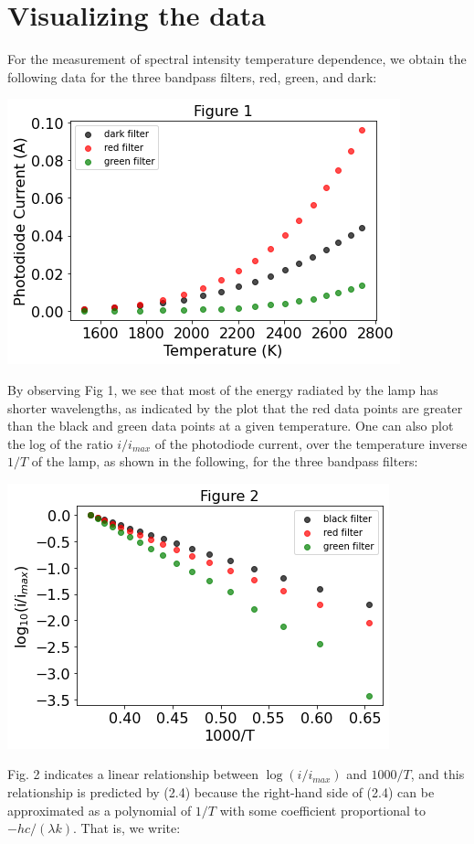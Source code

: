 \documentclass[11pt]{book}
\theoremstyle{break}
\theoremstyle{break}
\begin{document}
\newpage
\section{Visualizing the data}
For the measurement of spectral intensity temperature dependence, we obtain the following data for the three bandpass filters, red, green, and dark:
\begin{center}
\includegraphics[scale=0.65]{IvT.png}
\end{center}
By observing Fig 1, we see that most of the energy radiated by the lamp has shorter wavelengths, as indicated by the plot that the red data points are greater than the black and green data points at a given temperature. One can also plot the log of the ratio $i/i_{max}$ of the photodiode current, over the temperature inverse $1/T$ of the lamp, as shown in the following, for the three bandpass filters:
\begin{center}
\includegraphics[scale=0.65]{logIvlogT.png}
\end{center}
Fig. 2 indicates a linear relationship between $\log(i/i_{max})$ and $1000/T$, and this relationship is predicted by (2.4) because the right-hand side of (2.4) can be approximated as a polynomial of $1/T$ with some coefficient proportional to $-hc/(\lambda k)$. That is, we write:
\end{document}
